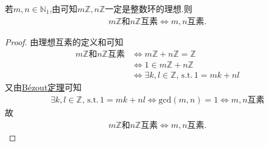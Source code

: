 \documentclass[../../main.tex]{subfiles}
\begin{document}
\begin{proposition}
若$m,n\in \mathbb{N}_1$,由可知$m\mathbb{Z},n\mathbb{Z}$一定是整数环的理想.则
\begin{align*}
m\mathbb{Z}\text{和}n\mathbb{Z}\text{互素} \iff m,n\text{互素}.
\end{align*}
\end{proposition}
\begin{proof}
由理想互素的定义和可知
\begin{align*}
m\mathbb{Z} \text{和}n\mathbb{Z} \text{互素}
&\Longleftrightarrow m\mathbb{Z} +n\mathbb{Z} =\mathbb{Z} \\
&\Longleftrightarrow 1\in m\mathbb{Z} +n\mathbb{Z} \\
&\Longleftrightarrow \exists k,l\in \mathbb{Z},\,\mathrm{s}.\mathrm{t}.\,1=mk+nl
\end{align*}
又由\hyperref[lemma:Bézout定理]{Bézout定理}可知
\begin{align*}
\exists k,l\in \mathbb{Z},\,\mathrm{s}.\mathrm{t}.\,1=mk+nl
\Longleftrightarrow \mathrm{gcd}(m,n) = 1 
\Longleftrightarrow m,n\text{互素}
\end{align*}
故
\begin{align*}
m\mathbb{Z} \text{和}n\mathbb{Z} \text{互素} \Longleftrightarrow m,n\text{互素}.
\end{align*}

\end{proof}
\end{document}
